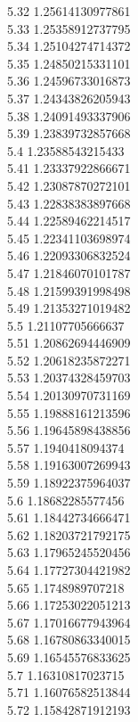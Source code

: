 {5.32	1.25614130977861\\
5.33	1.25358912737795\\
5.34	1.25104274714372\\
5.35	1.24850215331101\\
5.36	1.24596733016873\\
5.37	1.24343826205943\\
5.38	1.24091493337906\\
5.39	1.23839732857668\\
5.4	1.23588543215433\\
5.41	1.23337922866671\\
5.42	1.23087870272101\\
5.43	1.22838383897668\\
5.44	1.22589462214517\\
5.45	1.22341103698974\\
5.46	1.22093306832524\\
5.47	1.21846070101787\\
5.48	1.21599391998498\\
5.49	1.21353271019482\\
5.5	1.21107705666637\\
5.51	1.20862694446909\\
5.52	1.20618235872271\\
5.53	1.20374328459703\\
5.54	1.20130970731169\\
5.55	1.19888161213596\\
5.56	1.19645898438856\\
5.57	1.1940418094374\\
5.58	1.19163007269943\\
5.59	1.18922375964037\\
5.6	1.18682285577456\\
5.61	1.18442734666471\\
5.62	1.18203721792175\\
5.63	1.17965245520456\\
5.64	1.17727304421982\\
5.65	1.1748989707218\\
5.66	1.17253022051213\\
5.67	1.17016677943964\\
5.68	1.16780863340015\\
5.69	1.16545576833625\\
5.7	1.16310817023715\\
5.71	1.16076582513844\\
5.72	1.15842871912193\\
}
